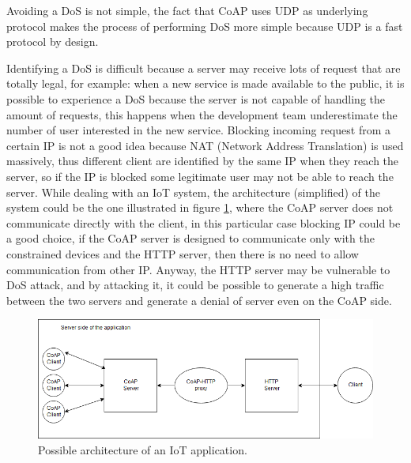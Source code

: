 	Avoiding a DoS is not simple, the fact that CoAP uses UDP as underlying protocol makes the process of performing DoS more simple because UDP is a fast protocol by design.\newline
	
	Identifying a DoS is difficult because a server may receive lots of request that are totally legal, for example: when a new service is made available to the public, it is possible to experience a DoS because the server is not capable of handling the amount of requests, this happens when the development team underestimate the number of user interested in the new service.\newline
	Blocking incoming request from a certain IP is not a good idea because NAT (Network Address Translation) is used massively, thus different client are identified by the same IP when they reach the server, so if the IP is blocked some legitimate user may not be able to reach the server.\newline
	While dealing with an IoT system, the architecture (simplified) of the system could be the one illustrated in figure \ref{fig:coap-vuln2}, where the CoAP server does not communicate directly with the client, in this particular case blocking IP could be a good choice, if the CoAP server is designed to communicate only with the constrained devices and the HTTP server, then there is no need to allow communication from other IP.\newline
	Anyway, the HTTP server may be vulnerable to DoS attack, and by attacking it, it could be possible to generate a high traffic between the two servers and generate a denial of server even on the CoAP side.\newline
	
	\begin{figure}
		\includegraphics[width=\linewidth]{coap-vuln-img2.png}
		\caption{Possible architecture of an IoT application.}
		\label{fig:coap-vuln2}
	\end{figure}
	
